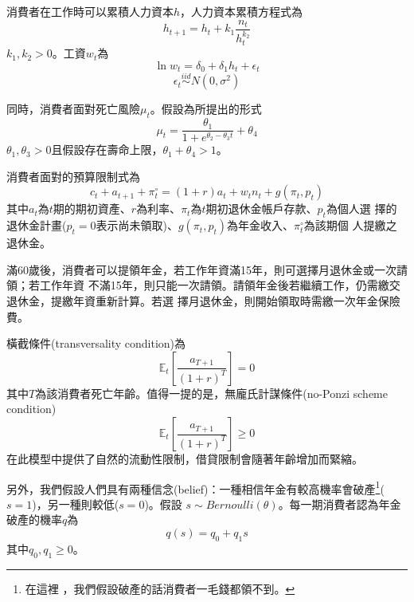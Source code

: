 \documentclass[12pt]{article}
\begin{document}
\begin{CJK*}{UTF8}{bkai}
消費者在工作時可以累積人力資本$h$，人力資本累積方程式為
\begin{equation}
    h_{t+1} = h_t + k_1\frac{n_t}{h_t^{k_2}}
\end{equation}
$k_1,k_2 > 0$。工資$w_t$為
\begin{equation}
    \ln w_t = \delta_0 + \delta_1 h_t + \epsilon_t
\end{equation}
\begin{equation}
    \epsilon_t \overset{iid}{\sim} N(0,\sigma^2)
\end{equation}

同時，消費者面對死亡風險$\mu_t$。假設為\cite{thatcher1999}所提出的形式
\begin{equation}
    \mu_t = \frac{\theta_1}{1+ e^{\theta_2 - \theta_3 t}} + \theta_4
\end{equation}
$\theta_1,\theta_3 > 0$且假設存在壽命上限，$\theta_1+\theta_4 > 1$。

消費者面對的預算限制式為
\begin{equation}
    c_t + a_{t+1} + \pi^\circ_t = (1+r)a_t + w_t n_t + g(\pi_t,p_t)
\end{equation}
其中$a_t$為$t$期的期初資產、$r$為利率、$\pi_t$為$t$期初退休金帳戶存款、$p_t$為個人選
擇的退休金計畫($p_t=0$表示尚未領取)、$g(\pi_t,p_t)$為年金收入、$\pi^\circ_t$為該期個
人提繳之退休金。

滿60歲後，消費者可以提領年金，若工作年資滿15年，則可選擇月退休金或一次請領；若工作年資
不滿15年，則只能一次請領。請領年金後若繼續工作，仍需繳交退休金，提繳年資重新計算。若選
擇月退休金，則開始領取時需繳一次年金保險費。

橫截條件(transversality condition)為
\begin{equation}
    \mathbb{E}_t[\frac{a_{T+1}}{(1+r)^T}] = 0
\end{equation}
其中$T$為該消費者死亡年齡。值得一提的是，無龐氏計謀條件(no-Ponzi scheme condition)
\begin{equation}
    \mathbb{E}_t[\frac{a_{T+1}}{(1+r)^T}] \geq 0
\end{equation}
在此模型中提供了自然的流動性限制，借貸限制會隨著年齡增加而緊縮。

另外，我們假設人們具有兩種信念(belief)：一種相信年金有較高機率會破產\footnote{在這裡
，我們假設破產的話消費者一毛錢都領不到。}($s=1$)，另一種則較低($s=0$)。假設
$s \sim Bernoulli(\theta)$。每一期消費者認為年金破產的機率$q$為
\begin{equation}
    q(s) = q_0 + q_1 s 
\end{equation}
其中$q_0,q_1 \geq 0$。


\end{CJK*}
\end{document}
